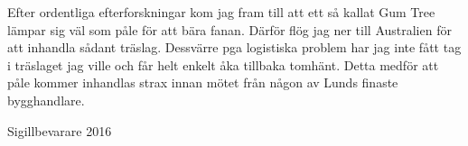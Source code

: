 \documentclass[../_main/handlingar.tex]{subfiles}
\begin{document}

Efter ordentliga efterforskningar kom jag fram till att ett så kallat Gum Tree lämpar sig väl som påle för att bära fanan. Därför flög jag ner till Australien för att inhandla sådant träslag. Dessvärre pga logistiska problem har jag inte fått tag i träslaget jag ville och får helt enkelt åka tillbaka tomhänt. Detta medför att påle kommer inhandlas strax innan mötet från någon av Lunds finaste bygghandlare.

\begin{signatures}{1}
    \mvh
    \signature{Emil Harvig}{Sigillbevarare 2016}
\end{signatures}
\end{document}
